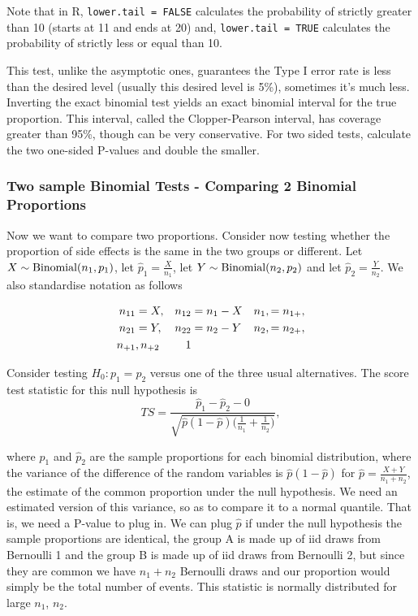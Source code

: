 \documentclass{homework}
\begin{document}
Note that in R, \texttt{lower.tail = FALSE} calculates the probability of strictly greater than 10 (starts at 11 and ends at 20) and, \texttt{lower.tail = TRUE} calculates the probability of strictly less or equal than 10. 

This test, unlike the asymptotic ones, guarantees the Type I error rate is less than the desired level (usually this desired level is 5\%), sometimes it's much less. Inverting the exact binomial test yields an exact binomial interval for the true proportion. This interval, called the Clopper-Pearson interval, has coverage greater than 95\%, though can be very conservative. For two sided tests, calculate the two one-sided P-values and double the smaller.  

\subsubsection{Two sample Binomial Tests - Comparing 2 Binomial Proportions}

Now we want to compare two proportions. Consider now testing whether the proportion of side effects is the same in the two groups or different. Let $X \sim \textnormal{Binomial}(n_1,p_1)$, let $\hat{p}_1=\frac{X}{n_1}$, let $Y \sim \textnormal{Binomial}(n_2,p_2)$ and let $\hat{p}_2=\frac{Y}{n_2}$. We also standardise notation as follows

\begin{align*}
    n_{11} & = X, & n_{12} &= n_1 - X & n_{1}, = n_{1+}, \\
    n_{21} & = Y, & n_{22} &= n_2 - Y & n_{2}, = n_{2+}, \\
    n_{+1} &, n_{+2} & \textnormal{ 1}
\end{align*}

Consider testing $H_0 : p_1 = p_2$ versus one of the three usual alternatives. The score test statistic for this null hypothesis is 
$$
TS = \frac{\hat{p}_1-\hat{p}_2 - 0}{\sqrt{\hat{p}(1-\hat{p})\bigg(\frac{1}{n_1}+\frac{1}{n_2}\bigg)}},
$$

where $\hat{p}_1$ and $\hat{p}_2$ are the sample proportions for each binomial distribution, where the variance of the difference of the random variables is $\hat{p}(1-\hat{p})$ for $\hat{p} = \frac{X+Y}{n_1+n_2}$, the estimate of the common proportion under the null hypothesis. We need an estimated version of this variance, so as to compare it to a normal quantile. That is, we need a P-value to plug in. We can plug $\hat{p}$ if under the null hypothesis the sample proportions are identical, the group A is made up of iid draws from Bernoulli 1 and the group B is made up of iid draws from Bernoulli 2, but since they are common we have $n_1+n_2$ Bernoulli draws and our proportion would simply be the total number of events. This statistic is normally distributed for large $n_1$, $n_2$. 
\end{document}
